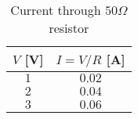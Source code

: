\begin{table}[htp]
	\begin{center}
	\caption{Current through $50 \Omega$ resistor}
	\label{tab:table_ohm2}
		\begin{tabular}{cc}
		\toprule
			{$V$ [V]} & {$I=V/R$ [A]}\\
			\midrule
			$1$ & $0.02$\\
			$2$ & $0.04$\\
			$3$ & $0.06$\\
		\bottomrule
		\end{tabular}
	\end{center}
\end{table}